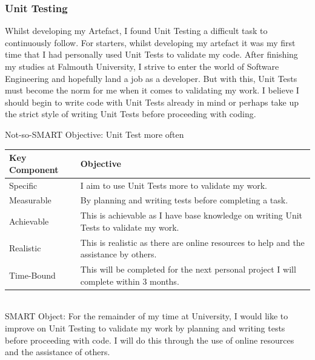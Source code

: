 \subsubsection{Unit Testing}
Whilst developing my Artefact, I found Unit Testing a difficult task to continuously follow. For starters, whilst developing my artefact it was my first time that I had personally used Unit Tests to validate my code. After finishing my studies at Falmouth University, I strive to enter the world of Software Engineering and hopefully land a job as a developer. But with this, Unit Tests must become the norm for me when it comes to validating my work. I believe I should begin to write code with Unit Tests already in mind or perhaps take up the strict style of writing Unit Tests before proceeding with coding.

\newpage
Not-so-SMART Objective: Unit Test more often
\\
\begin{tabular}{| p{} | p{} |}
    \hline
    \textbf{Key Component} & \textbf{Objective} \\
    \hline
    Specific & I aim to use Unit Tests more to validate my work.\\
    \hline
    Measurable & By planning and writing tests before completing a task.\\
    \hline
    Achievable & This is achievable as I have base knowledge on writing Unit Tests to validate my work.\\
    \hline
    Realistic & This is realistic as there are online resources to help and the assistance by others.\\
    \hline
    Time-Bound & This will be completed for the next personal project I will complete within 3 months.\\
    \hline
\end{tabular}
\\
SMART Object: For the remainder of my time at University, I would like to improve on Unit Testing to validate my work by planning and writing tests before proceeding with code. I will do this through the use of online resources and the assistance of others.

\newpage
